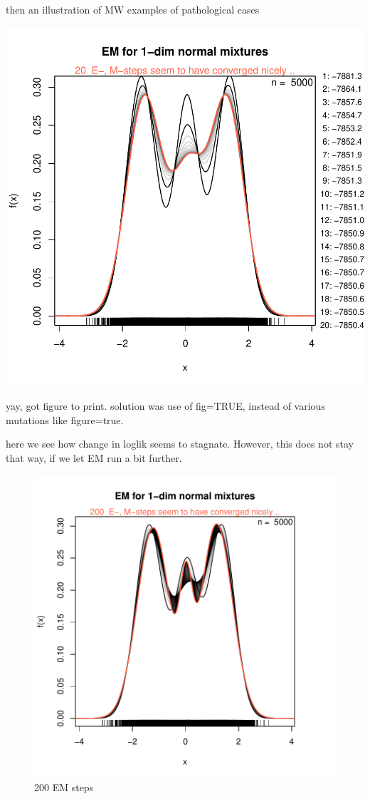 then an illustration of MW examples of pathological cases


\includegraphics{chapter1-nor1mixEx}


yay, got figure to print. solution was use of fig=TRUE, instead of various mutations like figure=true.

here we see how change in loglik seems to stagnate. However, this does not stay that way, if we let EM run a bit further.


\begin{figure}
\begin{center}
\includegraphics{chapter1-005}
\end{center}
\caption{200 EM steps}
\label{adfafdafds}
\end{figure}


